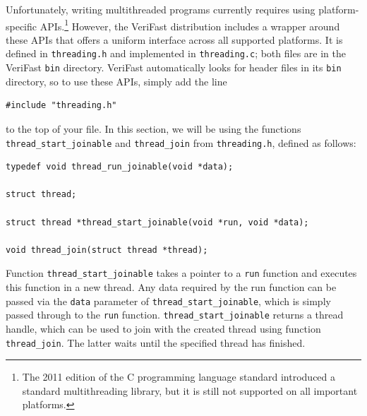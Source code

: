 \documentclass{article}
\begin{document}
Unfortunately, writing multithreaded programs currently requires using platform-specific APIs.\footnote{The 2011 edition of the C programming language standard introduced a standard multithreading library, but it is still not supported on all important platforms.}
However, the VeriFast distribution includes a wrapper around
these APIs that offers a uniform interface across all supported
platforms. It is defined in \texttt{threading.h} and
implemented in \texttt{threading.c}; both files are in the
VeriFast \texttt{bin} directory. VeriFast automatically looks
for header files in its \texttt{bin} directory, so to use these
APIs, simply add the line
\begin{lstlisting}
#include "threading.h"
\end{lstlisting}
to the top of your file. In this section, we will be using the
functions \lstinline!thread_start_joinable! and \lstinline!thread_join!
from \texttt{threading.h}, defined as follows:
\begin{lstlisting}
typedef void thread_run_joinable(void *data);

struct thread;

struct thread *thread_start_joinable(void *run, void *data);

void thread_join(struct thread *thread);
\end{lstlisting}
Function \lstinline!thread_start_joinable! takes a pointer to a
\lstinline!run! function and executes this function in a new
thread. Any data required by the run function can be passed via
the \lstinline!data! parameter of \lstinline!thread_start_joinable!,
which is simply passed through to the \lstinline!run! function.
\lstinline!thread_start_joinable! returns a thread handle, which can be
used to join with the created thread using function
\lstinline!thread_join!. The latter waits until the specified
thread has finished.
\end{document}
